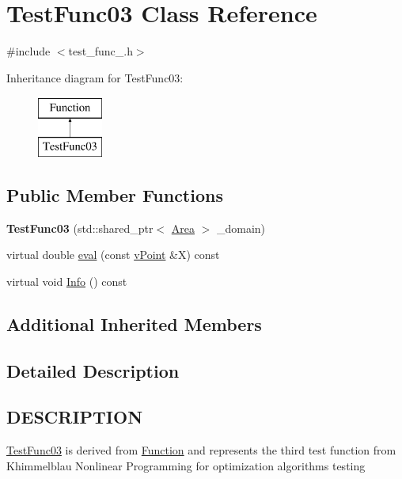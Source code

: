 \hypertarget{class_test_func03}{}\section{Test\+Func03 Class Reference}
\label{class_test_func03}


{\ttfamily \#include $<$test\+\_\+func\+\_.\+h$>$}

Inheritance diagram for Test\+Func03\+:\begin{figure}[H]
\begin{center}
\leavevmode
\includegraphics[height=2.000000cm]{class_test_func03}
\end{center}
\end{figure}
\subsection*{Public Member Functions}
\begin{DoxyCompactItemize}
\item 
\mbox{\label{class_test_func03_aa3c2e1a41327b59bd09bd2bbb2663406}} 
{\bfseries Test\+Func03} (std\+::shared\+\_\+ptr$<$ \hyperlink{class_area}{Area} $>$ \+\_\+domain)
\item 
virtual double \hyperlink{class_test_func03_a76417746f25346a1de704bfcac3eba47}{eval} (const \hyperlink{classv_point}{v\+Point} \&X) const
\item 
virtual void \hyperlink{class_test_func03_aab454f96f95f28f7ce1d58736d7fdf86}{Info} () const
\end{DoxyCompactItemize}
\subsection*{Additional Inherited Members}


\subsection{Detailed Description}
\hypertarget{function_8h_DESCRIPTION}{}\subsection{D\+E\+S\+C\+R\+I\+P\+T\+I\+ON}\label{function_8h_DESCRIPTION}
\hyperlink{class_test_func03}{Test\+Func03} is derived from \hyperlink{class_function}{Function} and represents the third test function from Khimmelblau \textquotesingle{}Nonlinear Programming\textquotesingle{} for optimization algorithms testing 

